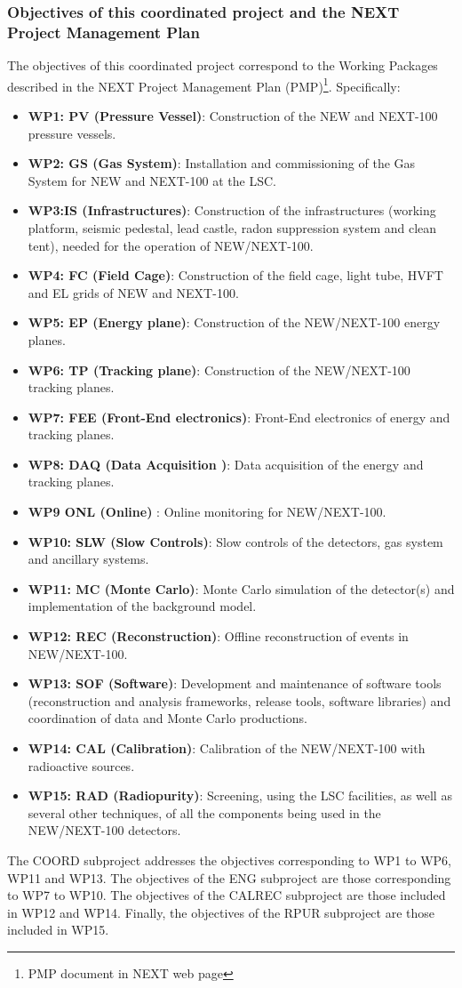 \subsubsection*{Objectives of this coordinated project and the NEXT Project Management Plan}

The objectives of this coordinated project correspond to the Working Packages described in the NEXT Project Management Plan (PMP)\footnote{PMP document in NEXT web page}. Specifically: 
\begin{itemize}
\item {\bf WP1: PV (Pressure Vessel)}: Construction of the NEW and NEXT-100 pressure vessels. 
\item {\bf WP2: GS (Gas System)}: Installation and commissioning of the Gas System for NEW and NEXT-100 at the LSC. 
\item {\bf WP3:IS (Infrastructures)}: Construction of the infrastructures (working platform, seismic pedestal, lead castle, radon suppression system and clean tent), needed for the operation of NEW/NEXT-100.
\item {\bf WP4: FC (Field Cage)}: Construction of the field cage, light tube, HVFT and EL grids of NEW and NEXT-100.
\item {\bf WP5: EP (Energy plane)}: Construction of the NEW/NEXT-100 energy planes.
\item {\bf WP6: TP (Tracking plane)}: Construction of the NEW/NEXT-100 tracking planes.
\item {\bf WP7: FEE (Front-End electronics)}: Front-End electronics of energy and tracking planes.
\item {\bf WP8: DAQ (Data Acquisition )}: Data  acquisition of the energy and tracking planes.
\item {\bf WP9 ONL (Online) }: Online monitoring for NEW/NEXT-100. 
\item {\bf WP10: SLW (Slow Controls)}: Slow controls of the detectors, gas system and ancillary systems.
\item {\bf WP11: MC (Monte Carlo)}: Monte Carlo simulation of the detector(s) and implementation of the background model. 
\item {\bf WP12: REC (Reconstruction)}: Offline reconstruction of events in NEW/NEXT-100.
\item {\bf WP13: SOF (Software)}: Development and maintenance of software tools (reconstruction and analysis frameworks, release tools, software libraries) and coordination of data and Monte Carlo productions. 
\item {\bf WP14: CAL (Calibration)}: Calibration of the NEW/NEXT-100 with radioactive sources. 
\item {\bf WP15: RAD (Radiopurity)}: Screening, using the LSC facilities, as well as several other techniques, of all the components being used in the  NEW/NEXT-100 detectors. 
\end{itemize}

The COORD subproject addresses the objectives corresponding to WP1 to WP6, WP11 and WP13. The objectives of the ENG subproject are those corresponding to WP7 to WP10. The objectives of the CALREC subproject are those included in WP12 and WP14. Finally, the objectives of the RPUR subproject are those included in WP15.  
